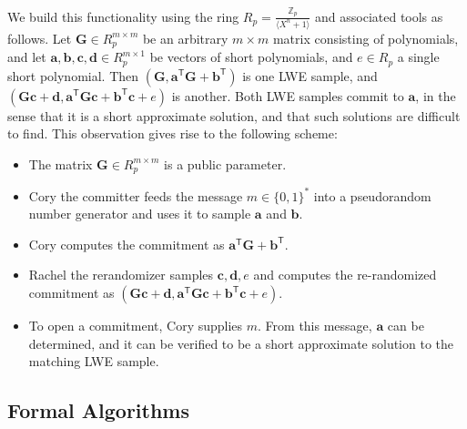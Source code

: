 We build this functionality using the ring $R_p = \frac{\mathbb{Z}_p}{\langle X^n + 1\rangle}$ and associated tools as follows. Let $\mathbf{G} \in R_p^{m \times m}$ be an arbitrary $m \times m$ matrix consisting of polynomials, and let $\mathbf{a}, \mathbf{b}, \mathbf{c}, \mathbf{d} \in R_p^{m \times 1}$ be vectors of short polynomials, and $e \in R_p$ a single short polynomial. Then $(\mathbf{G}, \mathbf{a}^\mathsf{T} \mathbf{G} + \mathbf{b}^\mathsf{T})$ is one LWE sample, and $(\mathbf{G}\mathbf{c} + \mathbf{d}, \mathbf{a}^\mathsf{T} \mathbf{G} \mathbf{c} + \mathbf{b}^\mathsf{T} \mathbf{c} + e)$ is another. Both LWE samples commit to $\mathbf{a}$, in the sense that it is a short approximate solution, and that such solutions are difficult to find. This observation gives rise to the following scheme:
\begin{itemize}
\item The matrix $\mathbf{G} \in R_p^{m \times m}$ is a public parameter.
\item Cory the committer feeds the message $m \in \{0,1\}^*$ into a pseudorandom number generator and uses it to sample $\mathbf{a}$ and $\mathbf{b}$.
\item Cory computes the commitment as $\mathbf{a}^\mathsf{T} \mathbf{G} + \mathbf{b}^\mathsf{T}$.
\item Rachel the rerandomizer samples $\mathbf{c}, \mathbf{d}, e$ and computes the re-randomized commitment as $(\mathbf{G}\mathbf{c} + \mathbf{d}, \mathbf{a}^\mathsf{T} \mathbf{G} \mathbf{c} + \mathbf{b}^\mathsf{T} \mathbf{c} + e)$.
\item To open a commitment, Cory supplies $m$. From this message, $\mathbf{a}$ can be determined, and it can be verified to be a short approximate solution to the matching LWE sample.
\end{itemize}

\subsection{Formal Algorithms}

